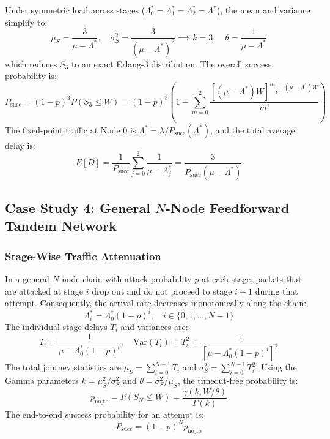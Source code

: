 \documentclass[12pt,onecolumn]{article}
\begin{document}
Under symmetric load across stages ($\Lambda_0^* = \Lambda_1^* = \Lambda_2^* = \Lambda^*$), the mean and variance simplify to:
\begin{equation}
\mu_S = \frac{3}{\mu - \Lambda^*}, \quad \sigma_S^2 = \frac{3}{(\mu - \Lambda^*)^2} \implies k = 3, \quad \theta = \frac{1}{\mu - \Lambda^*}
\end{equation}
which reduces $S_3$ to an exact Erlang-3 distribution. The overall success probability is:
\begin{equation}
P_{\text{succ}} = (1 - p)^3 P(S_3 \le W) = (1 - p)^3 \left(1 - \sum_{m=0}^2 \frac{[(\mu - \Lambda^*)W]^m e^{-(\mu - \Lambda^*)W}}{m!}\right)
\end{equation}
The fixed-point traffic at Node 0 is $\Lambda^* = \lambda / P_{\text{succ}}(\Lambda^*)$, and the total average delay is:
\begin{equation}
E[D] = \frac{1}{P_{\text{succ}}} \sum_{j=0}^2 \frac{1}{\mu - \Lambda_j^*} = \frac{3}{P_{\text{succ}}(\mu - \Lambda^*)}
\end{equation}

\subsection{Case Study 4: General \texorpdfstring{$N$}{N}-Node Feedforward Tandem Network}
\subsubsection{Stage-Wise Traffic Attenuation}
In a general $N$-node chain with attack probability $p$ at each stage, packets that are attacked at stage $i$ drop out and do not proceed to stage $i+1$ during that attempt. Consequently, the arrival rate decreases monotonically along the chain:
\begin{equation}
\Lambda_i^* = \Lambda_0^* (1 - p)^i, \quad i \in \{0, 1, \dots, N-1\}
\label{eq:tandem_attenuation}
\end{equation}
The individual stage delays $T_i$ and variances are:
\begin{equation}
T_i = \frac{1}{\mu - \Lambda_0^*(1 - p)^i}, \quad \text{Var}(T_i) = T_i^2 = \frac{1}{[\mu - \Lambda_0^*(1 - p)^i]^2}
\end{equation}
The total journey statistics are $\mu_S = \sum_{i=0}^{N-1} T_i$ and $\sigma_S^2 = \sum_{i=0}^{N-1} T_i^2$. Using the Gamma parameters $k = \mu_S^2 / \sigma_S^2$ and $\theta = \sigma_S^2 / \mu_S$, the timeout-free probability is:
\begin{equation}
p_{\text{no\_to}} = P(S_N \le W) = \frac{\gamma(k, W/\theta)}{\Gamma(k)}
\end{equation}
The end-to-end success probability for an attempt is:
\begin{equation}
P_{\text{succ}} = (1 - p)^N p_{\text{no\_to}}
\end{equation}
\end{document}
